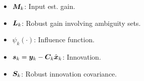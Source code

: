\documentclass[handout, aspectratio=169]{beamer}
\begin{document}
\begin{frame}[fragile]
\begin{columns}[T]
        \begin{column}{0.45\textwidth}
            \begin{tcolorbox}[colbacktitle=title1, title=\textbf{Notation}]
                \begin{itemize}
                    \item ${\bm{M}}_k$: Input est. gain. \pause
                    \item ${\bm{L}}_k$: Robust gain involving ambiguity sets. \pause
                    \item $\psi_k(\cdot)$: Influence function. \pause
                    \item ${\bm{s}}_k={\bm{y}}_k-{\bm{C}}_k\hat{{\bm{x}}}_k$: Innovation. \pause
                    \item ${\bm{S}}_k$: Robust innovation covariance.%
                \end{itemize}
            \end{tcolorbox}
        \end{column}
    \end{columns}
\end{frame}


\end{document}
